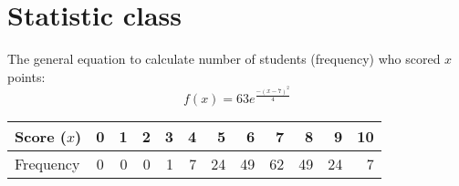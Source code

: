 \documentclass[12pt]{article}
\begin{document}

\newpage
\section*{Statistic class}
The general equation to calculate number of students (frequency) who scored $x$ points: $$f(x)=63e^{\frac{ -\left(x-7 \right)^2}{4}} $$ \par
\begin{center}
    \begin{tabular}{l | c*{10}r}
        Score ($x$) & 0 & 1 & 2 & 3 & 4 & 5 & 6 & 7 & 8 & 9 & 10 \\
        \hline
        Frequency &0 &0 &0 &1 &7 &24 &49 &62 &49 &24 &7 \\
    \end{tabular}
\end{center}
\end{document}
